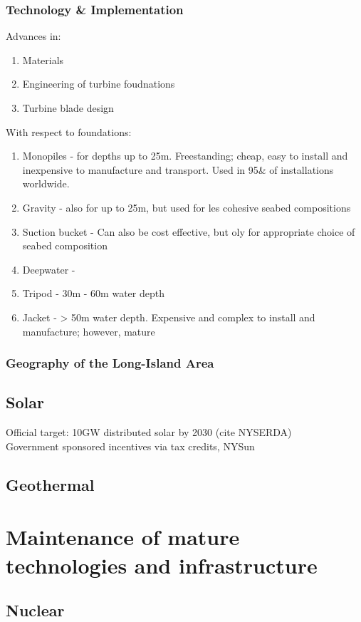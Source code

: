 \documentclass[plain]{article}
\newcommand{\1}{\mathbbm{1}}
\begin{document}
\subsubsection{Technology \& Implementation}
Advances in:
\begin{enumerate}
	\item Materials
	\item Engineering of turbine foudnations
	\item Turbine blade design
\end{enumerate}

With respect to foundations: \cite{mitchell_review_2022}
\begin{enumerate}
	\item Monopiles - for depths up to 25m. Freestanding; cheap, easy to install and inexpensive to manufacture and transport. Used in 95\& of installations worldwide.
	\item Gravity - also for up to 25m, but used for les cohesive seabed compositions
	\item Suction bucket - Can also be cost effective, but oly for appropriate choice of seabed composition
	\item Deepwater - 
	\item Tripod - 30m - 60m water depth
	\item Jacket - > 50m water depth. Expensive and complex to install and manufacture; however, mature
\end{enumerate}
\subsubsection{Geography of the Long-Island Area}

\subsection{Solar}
Official target: 10GW distributed solar by 2030 (cite NYSERDA)\\
Government sponsored incentives via tax credits, NYSun

\subsection{Geothermal}
\section{Maintenance of mature technologies and infrastructure}
\subsection{Nuclear}
\end{document}
